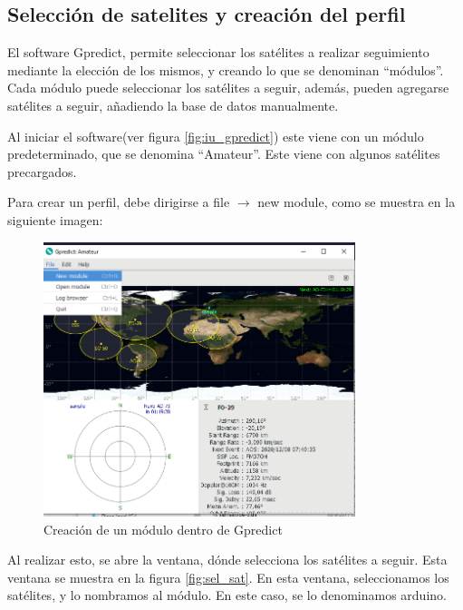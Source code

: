 \subsection{Selección de satelites y creación del perfil} 

El software Gpredict, permite seleccionar los satélites a realizar seguimiento mediante la elección de los mismos, y creando lo que se denominan ``módulos''. Cada módulo puede seleccionar los satélites a seguir, además, pueden agregarse satélites a seguir, añadiendo la base de datos manualmente.

Al iniciar el software(ver figura \ref{fig:iu_gpredict}) este viene con un módulo predeterminado, que se denomina ``Amateur''. Este viene con algunos satélites precargados. 

Para crear un perfil, debe dirigirse a file $\rightarrow$ new module, como se muestra en la siguiente imagen:%
\begin{figure}[ht]
	\centering
	\includegraphics[width=\textwidth,height=8cm]{create_module}
	\caption{Creación de un módulo dentro de Gpredict} 
	\label{fig:create_modul_gpred}	
\end{figure}

Al realizar esto, se abre la ventana, dónde selecciona los satélites a seguir. Esta ventana se muestra en la figura \ref{fig:sel_sat}. En esta ventana, seleccionamos los satélites, y lo nombramos al módulo. En este caso, se lo denominamos arduino. 

